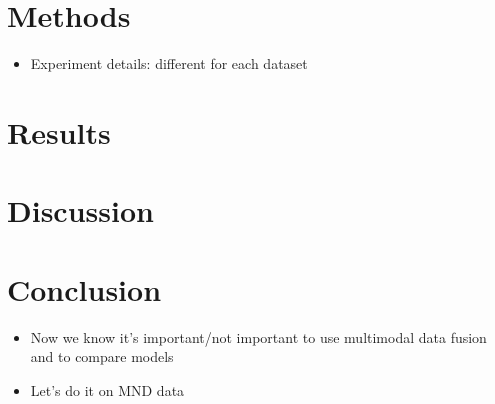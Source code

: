 \section{Methods}
\begin{itemize}
    \item Experiment details: different for each dataset
\end{itemize}

\section{Results}

\section{Discussion}

\section{Conclusion}
\begin{itemize}
    \item Now we know it's important/not important to use multimodal data fusion and to compare models
    \item Let's do it on MND data
\end{itemize}
